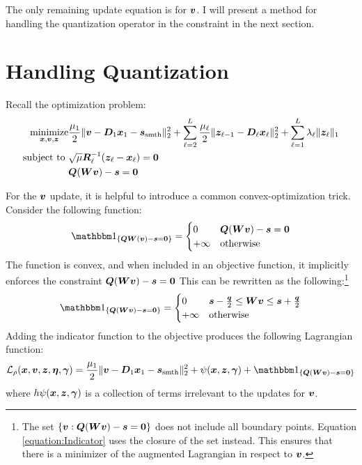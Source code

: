 The only remaining update equation is for $\bm{v}$. I will present a method for handling the quantization operator in the constraint in the next section.

\section{Handling Quantization}



Recall the optimization problem:
\begin{equation}
\begin{aligned}
\operatorname*{\text{minimize}}_{\bm{x},\bm{v},\bm{z}} & \frac{\mu_1}{2}\|\bm{v} - \bm{D}_1\bm{x}_1  - \bm{s}_{\text{smth}}\|_2^2 + \sum_{\ell = 2}^L \frac{\mu_{\ell}}{2}\|\bm{z}_{\ell - 1} - \bm{D}_{\ell}\bm{x}_{\ell}\|_2^2 + \sum_{\ell = 1}^L \lambda_{\ell}\|\bm{z}_{\ell}\|_1 \\
\text{subject to } & \sqrt{\mu}\bm{R}_{\ell}^{-1}(\bm{z}_{\ell} - \bm{x}_{\ell}) = \bm{0} \\
                   & \bm{Q}(\bm{W}\bm{v}) - \bm{s} = \bm{0}
\end{aligned}
\end{equation}


For the $\bm{v}$ update, it is helpful to introduce a common convex-optimization trick. Consider the following function:
\begin{equation}
\indicator_{\{\mQ\mW(\vv) - \vs = \vzero\}} = \begin{cases} 0 & \mQ(\mW\vv) - \vs = \vzero \\ + \infty & \text{otherwise} \end{cases}
\end{equation}
%
The function is convex, and when included in an objective function, it implicitly enforces the constraint $\bm{Q}(\bm{W}\bm{v}) - \bm{s} = \bm{0}$ This can be rewritten as the following:\footnote{The set $\{\bm{v}: \bm{Q}(\bm{W}\bm{v}) - \bm{s} = \bm{0}\}$ does not include all boundary points. Equation \ref{equation:Indicator} uses the closure of the set instead. This ensures that there is a minimizer of the augmented Lagrangian in respect to $\bm{v}$.} 
%
\begin{equation} \label{equation:Indicator}
\indicator_{\{\mQ(\mW\vv) - \vs = \vzero\}} = \begin{cases} 0 & \vs - \frac{\vq}{2} \leq \mW\vv \leq \vs + \frac{\vq}{2} \\ + \infty & \text{otherwise} \end{cases}
\end{equation}
%
Adding the indicator function to the objective produces the following Lagrangian function: 
%
\begin{equation}
\begin{split}
\L_{\rho}(\vx,\vv,\vz,\veta,\vgamma) =  \frac{\mu_1}{2}\|\vv - \mD_1\vx_1  - \vs_{\text{smth}}\|_2^2 + \psi(\vx,\vz,\vgamma) + \indicator_{\{\mQ(\mW\vv) - \vs = \vzero\}}
\end{split}
\end{equation}
%
where $h\psi(\bm{x},\bm{z},\bm{\gamma})$ is a collection of terms irrelevant to the updates for $\bm{v}$.

